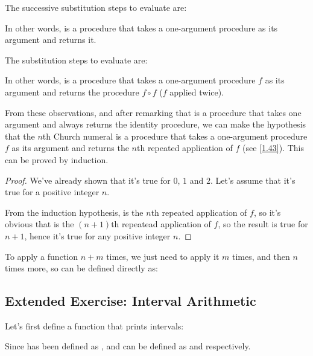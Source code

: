 \begin{exe}[2.6]
    The successive substitution steps to evaluate  are:

    In other words,  is a procedure that takes a one-argument 
    procedure as its argument and returns it.

    The substitution steps to evaluate  are:

    In other words,  is a procedure that takes a one-argument 
    procedure $f$ as its argument and returns the procedure $f \circ f$ ($f$ 
    applied twice).

    From these observations, and after remarking that  is a procedure 
    that takes one argument and always returns the identity procedure, we can 
    make the hypothesis that the $n$th Church numeral is a procedure that takes 
    a one-argument procedure $f$ as its argument and returns the $n$th repeated 
    application of $f$ (see \autoref{1.43}). This can be proved by induction.

    \begin{proof}
        We’ve already shown that it’s true for $0$, $1$ and $2$.
        Let’s assume that it’s true for a positive integer $n$.

        From the induction hypothesis,  is the $n$th repeated 
        application of $f$, so it’s obvious that
         is the $(n + 1)$th repeatead 
        application of $f$, so the result is true for $n + 1$, hence it’s true 
        for any positive integer $n$.
    \end{proof}

    To apply a function $n + m$ times, we just need to apply it $m$ times, and 
    then $n$ times more, so \vscm{+} can be defined directly as:
\end{exe}

\subsection{Extended Exercise: Interval Arithmetic}

Let’s first define a function that prints intervals:

\begin{exe}[2.7]
    Since  has been defined as , 
     and  can be defined as  and 
     respectively.
\end{exe}

